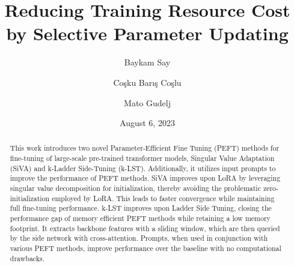 \documentclass[
  english,        %
  font=times,     %
  twocolumn,      %
]{tumarticle}
\title{Reducing Training Resource Cost by Selective Parameter Updating}
\author[affil=1, email=baykam.say@tum.de]{Baykam Say}
\author[affil=1, email=baris.coslu@tum.de]{Coşku Barış Coşlu}
\author[affil=1, email=mato.gudelj@tum.de]{Mato Gudelj}
\affil[mark=1]{\theDepartmentName, \theUniversityName}
\date{August 6, 2023}
\begin{document}
\maketitle

\begin{abstract}
  This work introduces two novel Parameter-Efficient Fine Tuning (PEFT) methods for fine-tuning of large-scale pre-trained transformer models, Singular Value Adaptation (SiVA) and k-Ladder Side-Tuning (k-LST). Additionally, it utilizes input prompts to improve the performance of PEFT methods. SiVA improves upon LoRA by leveraging singular value decomposition for initialization, thereby avoiding the problematic zero-initialization employed by LoRA. This leads to faster convergence while maintaining full fine-tuning performance. k-LST improves upon Ladder Side Tuning, closing the performance gap of memory efficient PEFT methods while retaining a low memory footprint. It extracts backbone features with a sliding window, which are then queried by the side network with cross-attention. Prompts, when used in conjunction with various PEFT methods, improve performance over the baseline with no computational drawbacks.
\end{abstract}











\printbibliography
\end{document}
